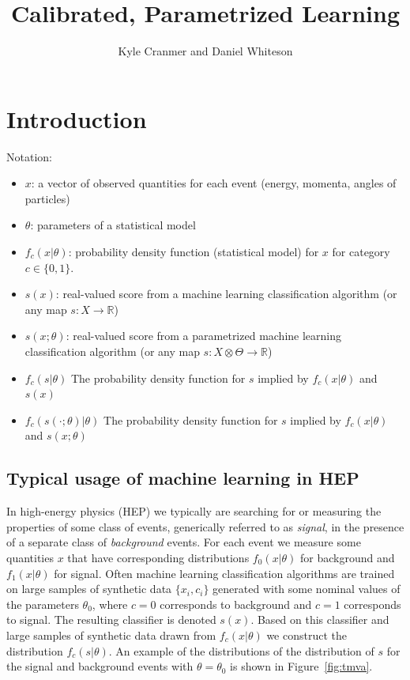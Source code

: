 \documentclass[11pt, oneside]{article}   	%
\title{Calibrated, Parametrized Learning}
\author{Kyle Cranmer and Daniel Whiteson}
\begin{document}
\maketitle

\section{Introduction}


Notation:

\begin{itemize}
 \item $x$: a vector of observed quantities for each event (energy, momenta, angles of particles)
 \item $\theta$: parameters of a statistical model
\item $f_c(x| \theta)$:  probability density function (statistical model) for $x$ for category $c\in\{0,1\}$.
\item $s(x)$: real-valued score from a machine learning classification algorithm (or any map $s: X\to\mathbb{R}$)
\item $s(x;\theta)$: real-valued score from a parametrized machine learning classification algorithm (or any map $s: X\otimes \Theta \to\mathbb{R}$)
\item $f_c( s | \theta )$ The probability density function for $s$ implied by $f_c(x|\theta)$ and $s(x)$
\item $f_c( s(\cdot; \theta) | \theta )$ The probability density function for $s$ implied by $f_c(x|\theta)$ and $s(x;\theta)$

\end{itemize}

\subsection{Typical usage of machine learning in HEP}

In high-energy physics (HEP) we typically are searching for or measuring the properties of some 
class of events, generically referred to as \textit{signal}, in the presence of a separate class 
of \textit{background} events. For each event we measure some quantities $x$ that have corresponding distributions 
$f_0(x|\theta)$ for background and $f_1(x|\theta)$ for signal.  Often machine learning classification algorithms are trained on large samples of synthetic data $\{x_i, c_i\}$ generated with some nominal values of the parameters $\theta_0$, where $c=0$ corresponds to background and $c=1$ corresponds to signal. The resulting classifier is denoted $s(x)$. Based on this classifier and large samples of synthetic data drawn from $f_c(x | \theta)$ we construct the distribution  $f_c(s | \theta)$. An example of the distributions of the distribution of $s$ for the signal and background events with $\theta=\theta_0$ is shown in Figure~\ref{fig:tmva}.
\end{document}
